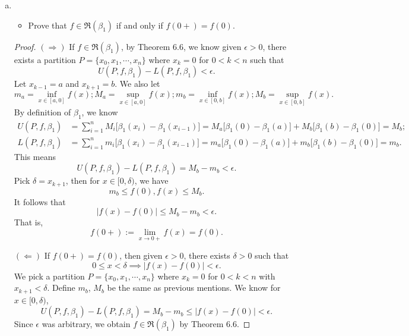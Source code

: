 \begin{Exercise}
	\begin{enumerate}[(a)]
		\item 
		\begin{itemize}
			\item Prove that $f\in \mathfrak{R}(\beta_1)$ if and only if $f(0+) = f(0)$.
		\end{itemize}
		\begin{proof}
			$(\Longrightarrow)$
			If $f\in \mathfrak{R}(\beta_1)$, by Theorem 6.6, we know given $\epsilon>0$, there exists a partition $P = \{x_0, x_1, \cdots, x_n\}$ where $x_k = 0$ for $0 < k < n$ such that 
			$$
			U(P,f,\beta_1) - L(P,f,\beta_1) < \epsilon.
			$$
			Let $x_{k-1} = a$ and $x_{k+1} = b$.
			We also let
			$$
			m_a = \inf_{x\in[a, 0]} f(x);
			M_a = \sup_{x\in[a, 0]} f(x);
			m_b = \inf_{x\in[0, b]} f(x);
			M_b = \sup_{x\in[0, b]} f(x).
			$$
			By definition of $\beta_1$, we know
			\begin{align*}
			U(P,f,\beta_1)
			&= \sum_{i=1}^{n}M_i \big[ \beta_1(x_i) - \beta_1(x_{i-1}) \big]
			= M_a \big[ \beta_1(0) - \beta_1(a) \big] + M_b \big[ \beta_1(b) - \beta_1(0) \big]
			= M_b; \\
			L(P,f,\beta_1)
			&= \sum_{i=1}^{n}m_i \big[ \beta_1(x_i) - \beta_1(x_{i-1}) \big]
			= m_a \big[ \beta_1(0) - \beta_1(a) \big] + m_b \big[ \beta_1(b) - \beta_1(0) \big]
			= m_b.
			\end{align*}
			This means
			$$
			U(P,f,\beta_1) - L(P,f,\beta_1) 
			= M_b - m_b
			< \epsilon.
			$$
			Pick $\delta = x_{k+1}$, then for $x\in[0, \delta)$, we have
			$$
			m_b \leq f(0), f(x) \leq M_b.
			$$
			It follows that
			$$
			|f(x) - f(0)| \leq M_b - m_b < \epsilon.
			$$
			That is, 
			$$
			f(0+) := \lim_{x\to 0+} f(x) = f(0).
			$$
			
			\vspace{2ex}
			
			$(\Longleftarrow)$
			If $f(0+) = f(0)$, then given $\epsilon > 0$, there exists $\delta > 0$ such that
			$$
			0 \leq x < \delta \implies |f(x) - f(0)| < \epsilon.
			$$
			We pick a partition $P = \{x_0, x_1, \cdots, x_n\}$ where $x_k = 0$ for $0 < k < n$ with $x_{k+1} < \delta$. 
			Define $m_b$, $M_b$ be the same as previous mentions.
			We know for $x\in [0, \delta)$,
			$$
			U(P,f,\beta_1) - L(P,f,\beta_1)
			= M_b - m_b
			\leq |f(x) - f(0)|
			< \epsilon.
			$$
			Since $\epsilon$ was arbitrary, we obtain $f\in\mathfrak{R}(\beta_1)$ by Theorem 6.6.
		\end{proof}
		

\end{enumerate}
\end{Exercise}
